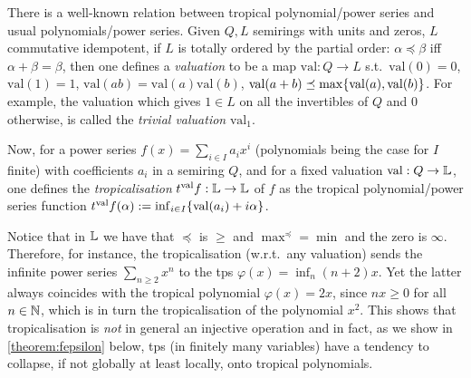 \begin{remark}\label{rmk:val_trop}
 There is a well-known relation between tropical polynomial/power series and usual polynomials/power series. 
Given $Q,L$ semirings with units and zeros, $L$ commutative idempotent, if $L$ is totally ordered by the partial order: $\alpha \preceq \beta$ iff $\alpha +  \beta = \beta$, then one defines a \emph{valuation} \cite{Izhakian2015} to be a map $\mathrm{val}:Q\to L$ s.t.\ $\mathrm{val}(0)=0$, $\mathrm{val}(1)=1$, $\mathrm{val}(ab)=\mathrm{val}(a)\mathrm{val}(b)$, $\mathrm{val}(a+b)\preceq \max\{\mathrm{val}(a),\mathrm{val}(b)\}$.
For example, the valuation which gives $1\in L$ on all the invertibles of $Q$ and $0$ otherwise, is called the \emph{trivial valuation} $\mathrm{val}_1$.

Now, for a power series $f(x)=\sum_{i\in I} a_i x^i$ (polynomials being the case for $I$ finite) with coefficients $a_i$ in a semiring $Q$, and for a fixed valuation $\mathrm{val}:Q\to \mathbb{L}$, one defines the \emph{tropicalisation} $\trop^{\mathrm{val}}f:\Lawv \to \Lawv$ of $f$ as the tropical polynomial/power series function $\trop^{\mathrm{val}}f(\alpha):=\inf_{i\in I} \set{\mathrm{val}(a_i)+i\alpha}$.
\end{remark}

Notice that in $\mathbb{L}$ we have that $\preceq$ is $\geq$ and $\max^{\preceq}=\min$ and the zero is $\infty$.
Therefore, for instance, the tropicalisation (w.r.t.\ any valuation) sends the infinite power series $\sum_{n\geq 2} x^n$ to the tps $\varphi(x)=\inf_n (n+2)x$.
Yet the latter always coincides with the tropical polynomial $\varphi(x)=2x$, since $nx\geq 0$ for all $n\in\mathbb{N}$, which is in turn the tropicalisation of the polynomial $x^2$.
This shows that tropicalisation is \emph{not} in general an injective operation and in fact, as we show in \autoref{theorem:fepsilon} below, tps (in finitely many variables) have a tendency to collapse, if not globally at least locally, onto tropical polynomials.

